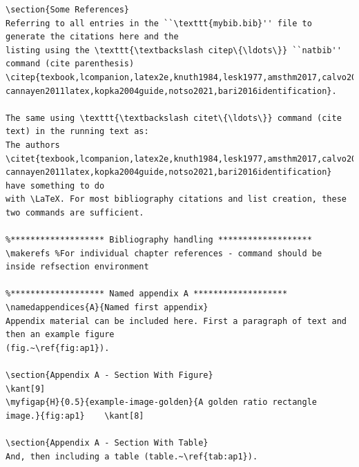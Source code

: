 \documentclass[letterpaper]{refart}
\begin{document}
{\begin{verbatim}
\section{Some References}
Referring to all entries in the ``\texttt{mybib.bib}'' file to generate the citations here and the 
listing using the \texttt{\textbackslash citep\{\ldots\}} ``natbib'' command (cite parenthesis) 
\citep{texbook,lcompanion,latex2e,knuth1984,lesk1977,amsthm2017,calvo2004using,
cannayen2011latex,kopka2004guide,notso2021,bari2016identification}.

The same using \texttt{\textbackslash citet\{\ldots\}} command (cite text) in the running text as: 
The authors \citet{texbook,lcompanion,latex2e,knuth1984,lesk1977,amsthm2017,calvo2004using,
cannayen2011latex,kopka2004guide,notso2021,bari2016identification} have something to do 
with \LaTeX. For most bibliography citations and list creation, these two commands are sufficient.

%******************* Bibliography handling *******************
\makerefs %For individual chapter references - command should be inside refsection environment

%******************* Named appendix A *******************
\namedappendices{A}{Named first appendix}
Appendix material can be included here. First a paragraph of text and then an example figure 
(fig.~\ref{fig:ap1}).

\section{Appendix A - Section With Figure}
\kant[9]
\myfigap{H}{0.5}{example-image-golden}{A golden ratio rectangle image.}{fig:ap1}	\kant[8]

\section{Appendix A - Section With Table}
And, then including a table (table.~\ref{tab:ap1}).


\end{verbatim}}
\end{document}
